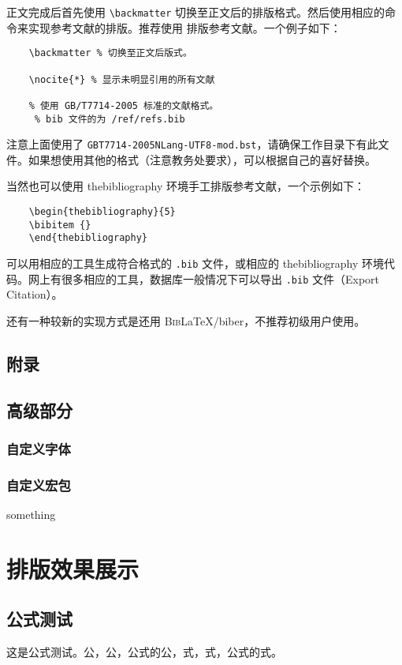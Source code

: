 \documentclass[%
               print, 
              ]{xjtubsc}
\begin{document}
正文完成后首先使用 \verb|\backmatter| 切换至正文后的排版格式。然后使用相应的命令来实现参考文献的排版。推荐使用  排版参考文献。一个例子如下：
\begin{verbatim}
    \backmatter % 切换至正文后版式。

    \nocite{*} % 显示未明显引用的所有文献
     
    % 使用 GB/T7714-2005 标准的文献格式。
     % bib 文件的为 /ref/refs.bib
\end{verbatim}
注意上面使用了 \verb|GBT7714-2005NLang-UTF8-mod.bst|，请确保工作目录下有此文件。如果想使用其他的格式（注意教务处要求），可以根据自己的喜好替换。

当然也可以使用 thebibliography 环境手工排版参考文献，一个示例如下：
\begin{verbatim}
    \begin{thebibliography}{5}
    \bibitem {}
    \end{thebibliography}
\end{verbatim}

可以用相应的工具生成符合格式的 \verb|.bib| 文件，或相应的 thebibliography 环境代码。网上有很多相应的工具，数据库一般情况下可以导出 \verb|.bib| 文件（Export Citation）。

还有一种较新的实现方式是还用 \textsc{Bib}\LaTeX{}/biber，不推荐初级用户使用。
\subsection{附录}

\subsection{高级部分}

\subsubsection{自定义字体}
\subsubsection{自定义宏包}
something

\section{排版效果展示}

\subsection{公式测试}
这是公式测试。公，公，公式的公，式，式，公式的式。
\end{document}
